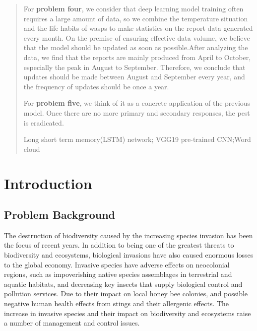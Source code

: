 \documentclass{mcmthesis}
\begin{document}
\begin{abstract}
For \textbf{problem four}, we consider that deep learning model training often requires a large amount of data, so we combine the temperature situation and the life habits of wasps to make statistics on the report data generated every month. On the premise of ensuring effective data volume, we believe that the model should be updated as soon as possible.After analyzing the data, we find that the reports are mainly produced from April to October, especially the peak in August to September. Therefore, we conclude that updates should be made between August and September every year, and the frequency of updates should be once a year.

For \textbf{problem five}, we think of it as a concrete application of the previous model. Once there are no more primary and secondary responses, the pest is eradicated.

\begin{keywords}%
Long short term memory(LSTM) network; VGG19 pre-trained CNN;Word cloud
\end{keywords}
\end{abstract}
\maketitle
\tableofcontents%
\newpage

\section{Introduction}
\subsection{Problem Background}
\hspace*{\fill}

The destruction of biodiversity caused by the increasing species invasion has been the focus of recent years. In addition to being one of the greatest threats to biodiversity and ecosystems, biological invasions have also caused enormous losses to the global economy. Invasive species have adverse effects on neocolonial regions, such as impoverishing native species assemblages in terrestrial and aquatic habitats, and decreasing key insects that supply biological control and pollution services. Due to their impact on local honey bee colonies, and possible negative human health effects from stings and their allergenic effects. The increase in invasive species and their impact on biodiversity and ecosystems raise a number of management and control issues.
\end{document}
